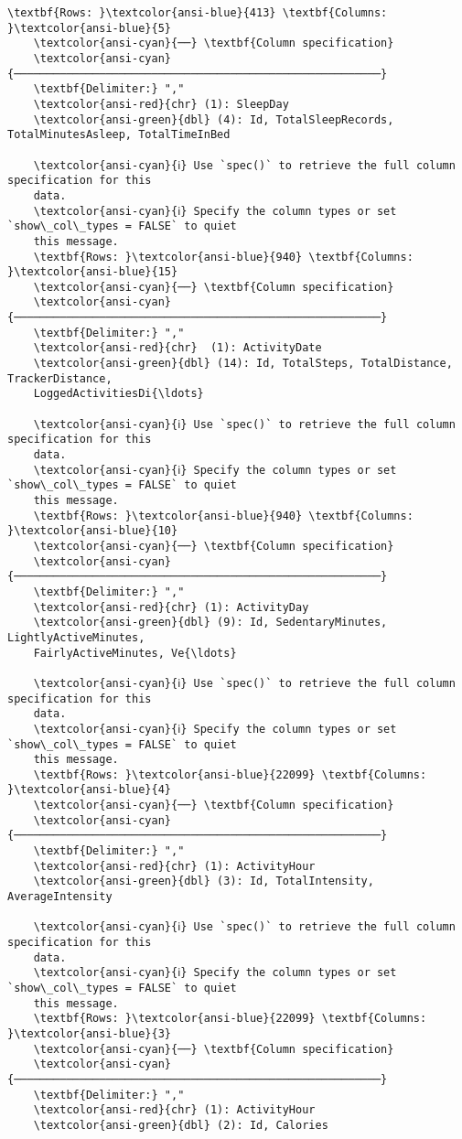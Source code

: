 \begin{Verbatim}[commandchars=\\\{\}]
    \textbf{Rows: }\textcolor{ansi-blue}{413} \textbf{Columns: }\textcolor{ansi-blue}{5}
    \textcolor{ansi-cyan}{──} \textbf{Column specification}
    \textcolor{ansi-cyan}{────────────────────────────────────────────────────────}
    \textbf{Delimiter:} ","
    \textcolor{ansi-red}{chr} (1): SleepDay
    \textcolor{ansi-green}{dbl} (4): Id, TotalSleepRecords, TotalMinutesAsleep, TotalTimeInBed

    \textcolor{ansi-cyan}{ℹ} Use `spec()` to retrieve the full column specification for this
    data.
    \textcolor{ansi-cyan}{ℹ} Specify the column types or set `show\_col\_types = FALSE` to quiet
    this message.
    \textbf{Rows: }\textcolor{ansi-blue}{940} \textbf{Columns: }\textcolor{ansi-blue}{15}
    \textcolor{ansi-cyan}{──} \textbf{Column specification}
    \textcolor{ansi-cyan}{────────────────────────────────────────────────────────}
    \textbf{Delimiter:} ","
    \textcolor{ansi-red}{chr}  (1): ActivityDate
    \textcolor{ansi-green}{dbl} (14): Id, TotalSteps, TotalDistance, TrackerDistance,
    LoggedActivitiesDi{\ldots}

    \textcolor{ansi-cyan}{ℹ} Use `spec()` to retrieve the full column specification for this
    data.
    \textcolor{ansi-cyan}{ℹ} Specify the column types or set `show\_col\_types = FALSE` to quiet
    this message.
    \textbf{Rows: }\textcolor{ansi-blue}{940} \textbf{Columns: }\textcolor{ansi-blue}{10}
    \textcolor{ansi-cyan}{──} \textbf{Column specification}
    \textcolor{ansi-cyan}{────────────────────────────────────────────────────────}
    \textbf{Delimiter:} ","
    \textcolor{ansi-red}{chr} (1): ActivityDay
    \textcolor{ansi-green}{dbl} (9): Id, SedentaryMinutes, LightlyActiveMinutes,
    FairlyActiveMinutes, Ve{\ldots}

    \textcolor{ansi-cyan}{ℹ} Use `spec()` to retrieve the full column specification for this
    data.
    \textcolor{ansi-cyan}{ℹ} Specify the column types or set `show\_col\_types = FALSE` to quiet
    this message.
    \textbf{Rows: }\textcolor{ansi-blue}{22099} \textbf{Columns: }\textcolor{ansi-blue}{4}
    \textcolor{ansi-cyan}{──} \textbf{Column specification}
    \textcolor{ansi-cyan}{────────────────────────────────────────────────────────}
    \textbf{Delimiter:} ","
    \textcolor{ansi-red}{chr} (1): ActivityHour
    \textcolor{ansi-green}{dbl} (3): Id, TotalIntensity, AverageIntensity

    \textcolor{ansi-cyan}{ℹ} Use `spec()` to retrieve the full column specification for this
    data.
    \textcolor{ansi-cyan}{ℹ} Specify the column types or set `show\_col\_types = FALSE` to quiet
    this message.
    \textbf{Rows: }\textcolor{ansi-blue}{22099} \textbf{Columns: }\textcolor{ansi-blue}{3}
    \textcolor{ansi-cyan}{──} \textbf{Column specification}
    \textcolor{ansi-cyan}{────────────────────────────────────────────────────────}
    \textbf{Delimiter:} ","
    \textcolor{ansi-red}{chr} (1): ActivityHour
    \textcolor{ansi-green}{dbl} (2): Id, Calories


\end{Verbatim}
